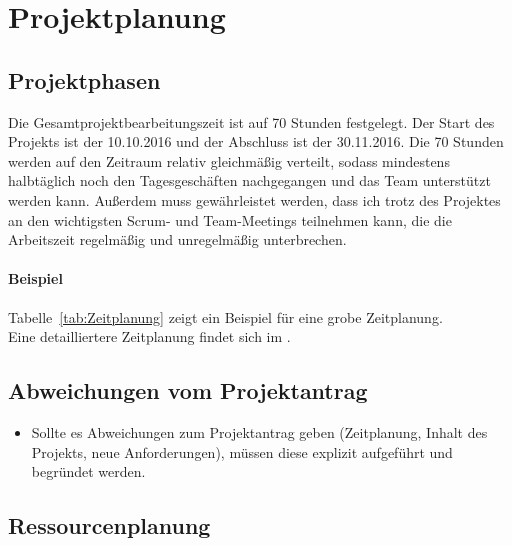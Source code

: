 \section{Projektplanung} 
\label{sec:Projektplanung}


\subsection{Projektphasen}
\label{sec:Projektphasen}

Die Gesamtprojektbearbeitungszeit ist auf 70 Stunden festgelegt. Der Start des Projekts ist der 10.10.2016 und der Abschluss ist der 30.11.2016. Die 70 Stunden werden auf den Zeitraum relativ gleichmäßig verteilt, sodass mindestens halbtäglich noch den Tagesgeschäften nachgegangen und das Team unterstützt werden kann. Außerdem muss gewährleistet werden, dass ich trotz des Projektes an den wichtigsten Scrum- und Team-Meetings teilnehmen kann, die die Arbeitszeit regelmäßig und unregelmäßig unterbrechen.

\paragraph{Beispiel}
Tabelle~\ref{tab:Zeitplanung} zeigt ein Beispiel für eine grobe Zeitplanung.
\\
Eine detailliertere Zeitplanung findet sich im .


\subsection{Abweichungen vom Projektantrag}
\label{sec:AbweichungenProjektantrag}

\begin{itemize}
	\item Sollte es Abweichungen zum Projektantrag geben (\zB Zeitplanung, Inhalt des Projekts, neue Anforderungen), müssen diese explizit aufgeführt und begründet werden.
\end{itemize}


\subsection{Ressourcenplanung}
\label{sec:Ressourcenplanung}

